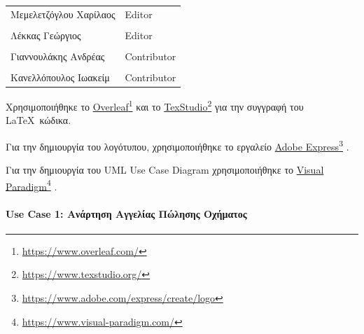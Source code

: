 \documentclass{../ol-softwaremanual}
\newcommand{\doclink}[2]{\href{#1}{#2}\footnote{\url{#1}}}
\begin{document}
	
	\vspace{20pt}
	
	\begin{table}[htbp!]
		\begin{tabular}{ll}
			Μεμελετζόγλου Χαρίλαος & \en Editor \\
			\\ Λέκκας Γεώργιος      &   \en  Editor \\
			\\ Γιαννουλάκης Ανδρέας & \en Contributor \\
			\\ Κανελλόπουλος Ιωακείμ & \en Contributor \\ 
		\end{tabular}
	\end{table}
	
	
	\vspace{20pt}
	
	
	\vspace{20pt}
	\flushleft
	Χρησιμοποιήθηκε το \en \doclink{https://www.overleaf.com/}{Overleaf} \gr και το \en \doclink{https://www.texstudio.org/}{TexStudio} \gr για την συγγραφή του \LaTeX\ κώδικα. \break
	
	Για την δημιουργία του λογότυπου, χρησιμοποιήθηκε το εργαλείο \en \doclink{https://www.adobe.com/express/create/logo}{Adobe Express} . \gr \break
	
	Για την δημιουργία του \en UML Use Case Diagram \gr χρησιμοποιήθηκε το \en \doclink{https://www.visual-paradigm.com/}{Visual Paradigm} . \gr \break 
	
	\newpage
	
	
	\paragraph{\en Use Case 1: \gr Ανάρτηση Αγγελίας Πώλησης Οχήματος}
	
\end{document}
